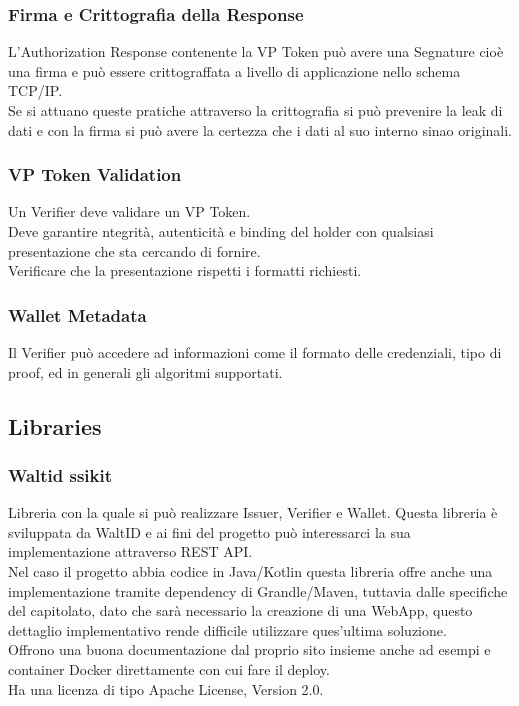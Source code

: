 \subsubsection{Firma e Crittografia della Response}
L'Authorization Response contenente la VP Token può avere una Segnature cioè una firma e può essere crittograffata
a livello di applicazione nello schema TCP/IP.\\
Se si attuano queste pratiche attraverso la crittografia si può prevenire la leak di dati e con la firma si può avere la certezza che 
i dati al suo interno sinao originali.

\subsubsection{VP Token Validation}
Un Verifier deve validare un VP Token.\\
Deve garantire ntegrità, autenticità e binding del holder con qualsiasi presentazione che sta cercando di fornire.\\
Verificare che la presentazione rispetti i formatti richiesti.

\subsubsection{Wallet Metadata}
Il Verifier può accedere ad informazioni come il formato delle credenziali, tipo di proof, ed in generali gli algoritmi supportati.

\subsection{Libraries}
\subsubsection{Waltid ssikit}
Libreria con la quale si può realizzare Issuer, Verifier e Wallet.
Questa libreria è sviluppata da WaltID e ai fini del progetto può interessarci la sua implementazione attraverso REST API.\\
Nel caso il progetto abbia codice in Java/Kotlin questa libreria offre anche una implementazione tramite dependency di Grandle/Maven, tuttavia 
dalle specifiche del capitolato, dato che sarà necessario la creazione di una WebApp, questo dettaglio implementativo rende 
difficile utilizzare ques'ultima soluzione.\\
Offrono una buona documentazione dal proprio sito insieme anche ad esempi e container Docker direttamente con cui fare il deploy.\\
Ha una licenza di tipo  Apache License, Version 2.0.

